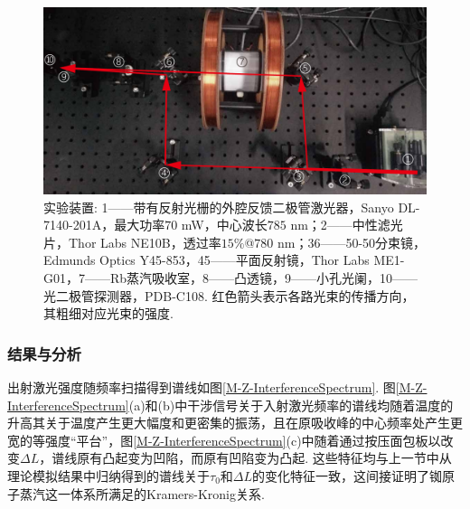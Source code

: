 \documentclass[a4paper, 10pt]{article}
\begin{document}
\begin{multicols*}{2}
\begin{figure}[H]
    \centering
    \includegraphics[width=.9\columnwidth]{M-Z-LightPath.pdf}
    \caption{实验装置: \textcircled{\footnotesize{1}}——带有反射光栅的外腔反馈二极管激光器，Sanyo DL-7140-201A，最大功率$70$ mW，中心波长$785$ nm；\textcircled{\footnotesize{2}}——中性滤光片，Thor Labs NE10B，透过率$15\%$@$780$ nm；\textcircled{\footnotesize{3}}\textcircled{\footnotesize{6}}——50-50分束镜，Edmunds Optics Y45-853，\textcircled{\footnotesize{4}}\textcircled{\footnotesize{5}}——平面反射镜，Thor Labs ME1-G01，\textcircled{\footnotesize{7}}——Rb蒸汽吸收室，\textcircled{\footnotesize{8}}——凸透镜，\textcircled{\footnotesize{9}}——小孔光阑，\textcircled{\footnotesize{10}}——光二极管探测器，PDB-C108. 红色箭头表示各路光束的传播方向，其粗细对应光束的强度.}
    \label{M-Z-light-path}
\end{figure}

\subsubsection{结果与分析}

出射激光强度随频率扫描得到谱线如图\ref{M-Z-InterferenceSpectrum}. 图\ref{M-Z-InterferenceSpectrum}(a)和(b)中干涉信号关于入射激光频率的谱线均随着温度的升高其关于温度产生更大幅度和更密集的振荡，且在原吸收峰的中心频率处产生更宽的等强度“平台”，图\ref{M-Z-InterferenceSpectrum}(c)中随着通过按压面包板以改变$\Delta L$，谱线原有凸起变为凹陷，而原有凹陷变为凸起. 这些特征均与上一节中从理论模拟结果中归纳得到的谱线关于$\tau_0$和$\Delta L$的变化特征一致，这间接证明了铷原子蒸汽这一体系所满足的Kramers-Kronig关系.


\end{multicols*}
\end{document}
